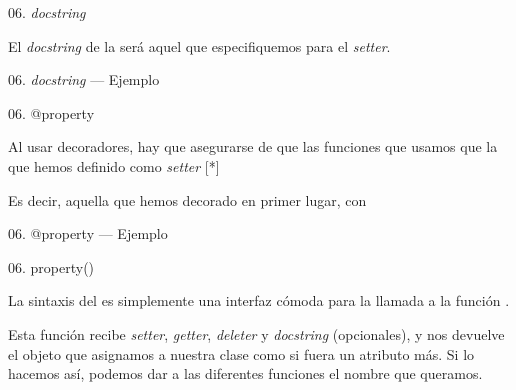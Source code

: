\begin{frame}{06. \textit{docstring}}
  \begin{block}{}
    \large
    \centering
    El \textit{docstring} de la  será aquel que
     especifiquemos para el \textit{setter}.
  \end{block}
\end{frame}

\begin{frame}{06. \textit{docstring} — Ejemplo}
  \scriptsize
\end{frame}

\begin{frame}{06. @property}
  \begin{alertblock}{}
    \centering
    Al usar decoradores, hay que asegurarse de que las funciones que
    usamos  que la que hemos
    definido como \textit{setter} [*]
  \end{alertblock}

  \begin{center}
    \footnotesize
    \centering
        [*] Es decir, aquella que hemos decorado en primer lugar, con
  \end{center}
\end{frame}

\begin{frame}{06. @property — Ejemplo}
  \scriptsize
\end{frame}

\begin{frame}{06. property()}
  \begin{alertblock}{}
    \centering
    La sintaxis del  es simplemente una interfaz
    cómoda para la llamada a la función .
  \end{alertblock}

  \begin{center}
    \small
     Esta función recibe \textit{setter}, \textit{getter},
     \textit{deleter} y \textit{docstring} (opcionales), y nos
     devuelve el objeto  que asignamos a
     nuestra clase como si fuera un atributo más. Si lo hacemos así,
     podemos dar a las diferentes funciones el nombre que queramos.
  \end{center}
\end{frame}


